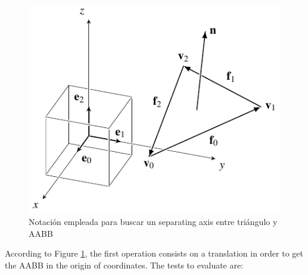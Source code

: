 \begin{figure}
    \centering
    \includegraphics[width=.6\textwidth]{img/search/triangle_aabb.pdf}
    \caption{Notación empleada para buscar un separating axis entre triángulo y AABB}
    \label{triangle_aabb}
\end{figure}

According to Figure \ref{triangle_aabb}, the first operation consists on a translation in order to get the AABB in the origin of coordinates. The tests to evaluate are:


